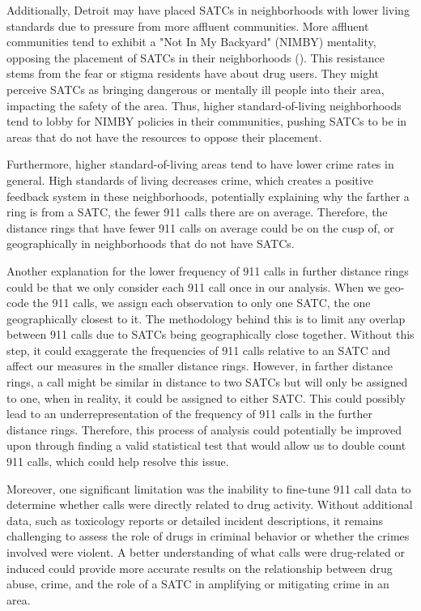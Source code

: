 \documentclass[12pt]{article}
\begin{document}
Additionally, Detroit may have placed SATCs in neighborhoods with lower living standards due to pressure from more affluent communities. More affluent communities tend to exhibit a "Not In My Backyard" (NIMBY) mentality, opposing the placement of SATCs in their neighborhoods (\citealp{NIMBY}). This resistance stems from the fear or stigma residents have about drug users. They might perceive SATCs as bringing dangerous or mentally ill people into their area, impacting the safety of the area. Thus, higher standard-of-living neighborhoods tend to lobby for NIMBY policies in their communities, pushing SATCs to be in areas that do not have the resources to oppose their placement.

Furthermore, higher standard-of-living areas tend to have lower crime rates in general. High standards of living decreases crime, which creates a positive feedback system in these neighborhoods, potentially explaining why the farther a ring is from a SATC, the fewer 911 calls there are on average. Therefore, the distance rings that have fewer 911 calls on average could be on the cusp of, or geographically in neighborhoods that do not have SATCs. 
    
Another explanation for the lower frequency of 911 calls in further distance rings could be that we only consider each 911 call once in our analysis. When we geo-code the 911 calls, we assign each observation to only one SATC, the one geographically closest to it. The methodology behind this is to limit any overlap between 911 calls due to SATCs being geographically close together. Without this step, it could exaggerate the frequencies of 911 calls relative to an SATC and affect our measures in the smaller distance rings.  However, in farther distance rings, a call might be similar in distance to two SATCs but will only be assigned to one, when in reality, it could be assigned to either SATC. This could possibly lead to an underrepresentation of the frequency of 911 calls in the further distance rings. Therefore, this process of analysis could potentially be improved upon through finding a valid statistical test that would allow us to double count 911 calls, which could help resolve this issue. 

Moreover, one significant limitation was the inability to fine-tune 911 call data to determine whether calls were directly related to drug activity. Without additional data, such as toxicology reports or detailed incident descriptions, it remains challenging to assess the role of drugs in criminal behavior or whether the crimes involved were violent. A better understanding of what calls were drug-related or induced could provide more accurate results on the relationship between drug abuse, crime, and the role of a SATC in amplifying or mitigating crime in an area. 
    
\end{document}
